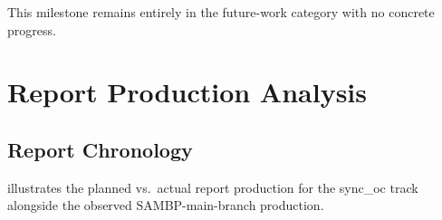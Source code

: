 \documentclass[12pt,a4paper]{article}
\begin{document}
This milestone remains entirely in the future-work category with no concrete
progress.


\section{Report Production Analysis}
\label{sec:reports}

\subsection{Report Chronology}
\label{sec:rep:chrono}

 illustrates the planned vs.\ actual report production
for the sync\_oc track alongside the observed SAMBP-main-branch production.
\end{document}
